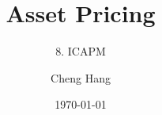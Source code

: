 \documentclass{beamer}
\title[Asset Pricing]{\textbf{Asset Pricing}} %
\subtitle{8. ICAPM}
\author[Cheng Hang]{Cheng Hang} %
\institute[DUFE] %
{School of Fintech \\
Dongbei University of Finance \& Economics \\ %
\medskip
\textbf{chenghangch@qq.com}%
}
\date{\today} %
\begin{document}
\begin{frame}
\titlepage %
\end{frame}


\end{document}
